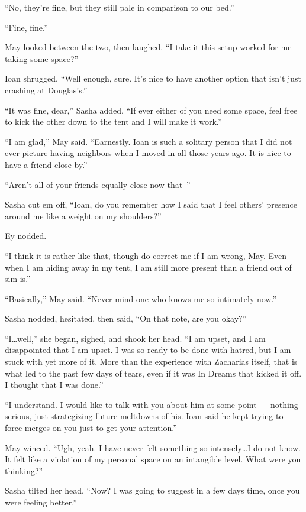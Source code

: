 ``No, they're fine, but they still pale in comparison to our bed.''

``Fine, fine.''

May looked between the two, then laughed. ``I take it this setup worked for me taking some space?''

Ioan shrugged. ``Well enough, sure. It's nice to have another option that isn't just crashing at Douglas's.''

``It was fine, dear,'' Sasha added. ``If ever either of you need some space, feel free to kick the other down to the tent and I will make it work.''

``I am glad,'' May said. ``Earnestly. Ioan is such a solitary person that I did not ever picture having neighbors when I moved in all those years ago. It is nice to have a friend close by.''

``Aren't all of your friends equally close now that--''

Sasha cut em off, ``Ioan, do you remember how I said that I feel others' presence around me like a weight on my shoulders?''

Ey nodded.

``I think it is rather like that, though do correct me if I am wrong, May. Even when I am hiding away in my tent, I am still more present than a friend out of sim is.''

``Basically,'' May said. ``Never mind one who knows me so intimately now.''

Sasha nodded, hesitated, then said, ``On that note, are you okay?''

``I\ldots well,'' she began, sighed, and shook her head. ``I am upset, and I am disappointed that I am upset. I was so ready to be done with hatred, but I am stuck with yet more of it. More than the experience with Zacharias itself, that is what led to the past few days of tears, even if it was In Dreams that kicked it off. I thought that I was done.''

``I understand. I would like to talk with you about him at some point — nothing serious, just strategizing future meltdowns of his. Ioan said he kept trying to force merges on you just to get your attention.''

May winced. ``Ugh, yeah. I have never felt something so intensely\ldots I do not know. It felt like a violation of my personal space on an intangible level. What were you thinking?''

Sasha tilted her head. ``Now? I was going to suggest in a few days time, once you were feeling better.''

